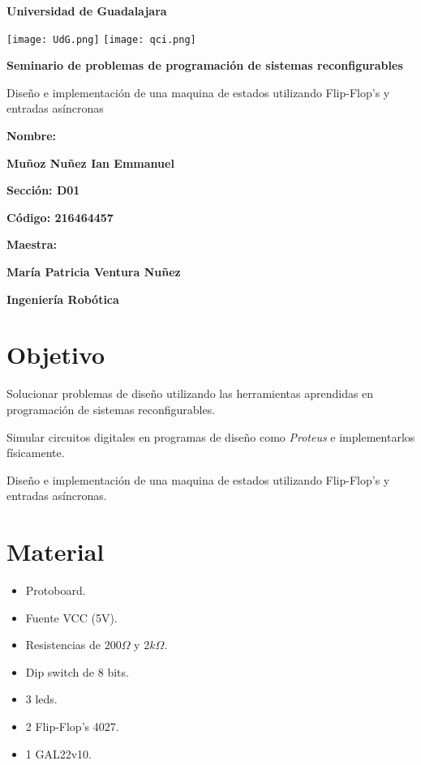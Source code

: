 \documentclass[12pt, oneside, openany]{article}
\begin{document}
\begin{titlepage}
    \centering
    {\bfseries\LARGE Universidad de Guadalajara \par}
    \vfill
    {
        \texttt{[image: UdG.png]}
        \texttt{[image: qci.png]}
        \par
    }
    \vfill
    {\bfseries\LARGE Seminario de problemas de programación de sistemas reconfigurables \par}
    \vfill
    {\LARGE Diseño e implementación de una maquina de estados utilizando Flip-Flop's y entradas asíncronas \par}
    \vfill
    {\bfseries\LARGE Nombre: \par}
    \vfill
    {\bfseries\LARGE Muñoz Nuñez Ian Emmanuel \par}
    \vfill
    {\bfseries\LARGE Sección: D01 \par}
    \vfill
    {\bfseries\LARGE Código: 216464457 \par}
    \vfill
    {\bfseries\LARGE Maestra: \par}
    \vfill
    {\bfseries\LARGE María Patricia Ventura Nuñez \par}
    \vfill
    {\bfseries\LARGE Ingeniería Robótica \par}
\end{titlepage}


\newpage
\section{Objetivo}
{\sffamily\large
    \hspace{0.5cm} Solucionar problemas de diseño utilizando las herramientas aprendidas en programación de sistemas reconfigurables.
    
    \hspace{0.5cm} Simular circuitos digitales en programas de diseño como \emph{Proteus\textregistered} e implementarlos físicamente.
    
    \hspace{0.5cm} Diseño e implementación de una maquina de estados utilizando Flip-Flop's y entradas asíncronas.
    
}

\section{Material}
{\sffamily\large
    \renewcommand{\labelitemi}{$\bullet$}
    \begin{itemize}
        \item Protoboard.
        \item Fuente VCC (5V).
        \item Resistencias de $200\Omega$ y $2k\Omega$.
        \item Dip switch de 8 bits.
        \item 3 leds.
        \item 2 Flip-Flop's 4027.
        \item 1 GAL22v10.
    \end{itemize}
}
\end{document}
